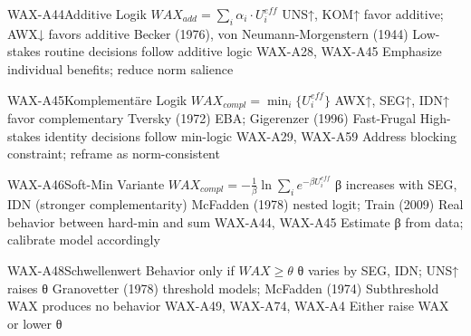 

\begin{axiomspec}{WAX-A44}{Additive Logik}
 $WAX_{add} = \sum_i \alpha_i \cdot U_i^{eff}$
 UNS↑, KOM↑ favor additive; AWX↓ favors additive
 Becker (1976), von Neumann-Morgenstern (1944)
 Low-stakes routine decisions follow additive logic
 WAX-A28, WAX-A45
 Emphasize individual benefits; reduce norm salience
\end{axiomspec}

\begin{axiomspec}{WAX-A45}{Komplementäre Logik}
 $WAX_{compl} = \min_i \{U_i^{eff}\}$
 AWX↑, SEG↑, IDN↑ favor complementary
 Tversky (1972) EBA; Gigerenzer (1996) Fast-Frugal
 High-stakes identity decisions follow min-logic
 WAX-A29, WAX-A59
 Address blocking constraint; reframe as norm-consistent
\end{axiomspec}

\begin{axiomspec}{WAX-A46}{Soft-Min Variante}
 $WAX_{compl} = -\frac{1}{\beta}\ln\sum_i e^{-\beta U_i^{eff}}$
 β increases with SEG, IDN (stronger complementarity)
 McFadden (1978) nested logit; Train (2009)
 Real behavior between hard-min and sum
 WAX-A44, WAX-A45
 Estimate β from data; calibrate model accordingly
\end{axiomspec}

\begin{axiomspec}{WAX-A48}{Schwellenwert}
 Behavior only if $WAX \geq \theta$
 θ varies by SEG, IDN; UNS↑ raises θ
 Granovetter (1978) threshold models; McFadden (1974)
 Subthreshold WAX produces no behavior
 WAX-A49, WAX-A74, WAX-A4
 Either raise WAX or lower θ
\end{axiomspec}

